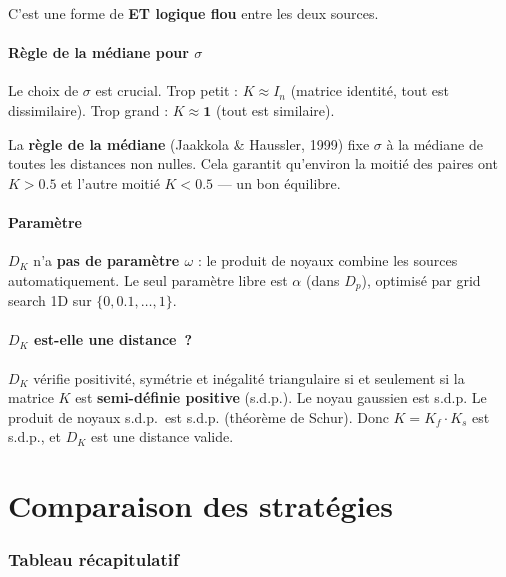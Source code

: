 \documentclass[11pt, a4paper]{article}
\newcommand{\Dp}{D_p}
\newcommand{\DK}{D_K}
\theoremstyle{definition}
\theoremstyle{remark}
\begin{document}
C'est une forme de \textbf{ET logique flou} entre les deux sources.

\subsection{Règle de la médiane pour $\sigma$}

Le choix de $\sigma$ est crucial. Trop petit : $K \approx I_n$ (matrice
identité, tout est dissimilaire). Trop grand : $K \approx \mathbf{1}$
(tout est similaire).

La \textbf{règle de la médiane} (Jaakkola \& Haussler, 1999) fixe
$\sigma$ à la médiane de toutes les distances non nulles. Cela garantit
qu'environ la moitié des paires ont $K > 0.5$ et l'autre moitié $K < 0.5$
— un bon équilibre.

\subsection{Paramètre}

$\DK$ n'a \textbf{pas de paramètre $\omega$} : le produit de noyaux combine
les sources automatiquement. Le seul paramètre libre est $\alpha$ (dans $\Dp$),
optimisé par grid search 1D sur $\{0, 0.1, \ldots, 1\}$.

\subsection{$\DK$ est-elle une distance~?}

$\DK$ vérifie positivité, symétrie et inégalité triangulaire si et seulement
si la matrice $K$ est \textbf{semi-définie positive} (s.d.p.). Le noyau
gaussien est s.d.p. Le produit de noyaux s.d.p.\ est s.d.p. (théorème de
Schur). Donc $K = K_f \cdot K_s$ est s.d.p., et $\DK$ est une distance valide.

\newpage
\part{Comparaison des stratégies}

\section{Tableau récapitulatif}
\end{document}
